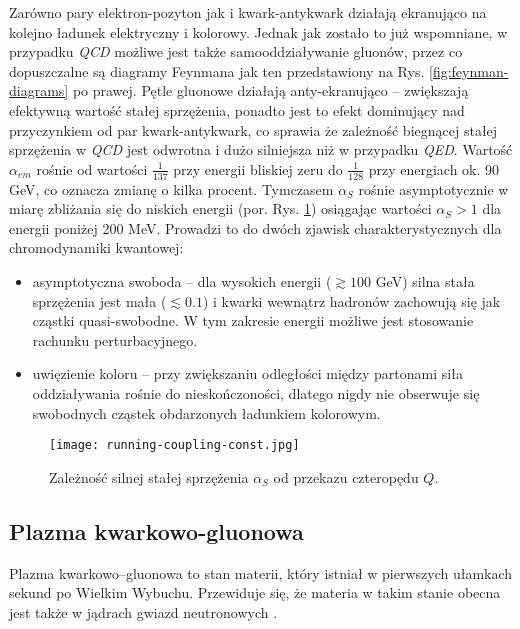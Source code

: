 Zarówno pary elektron-pozyton jak i kwark-antykwark działają ekranująco na kolejno ładunek elektryczny i kolorowy. Jednak jak zostało to już wspomniane, w przypadku \textit{QCD} możliwe jest także samooddziaływanie gluonów, przez co dopuszczalne są diagramy Feynmana jak ten przedstawiony na Rys. \ref{fig:feynman-diagrams} po prawej. Pętle gluonowe działają anty-ekranująco -- zwiększają efektywną wartość stałej sprzężenia, ponadto jest to efekt dominujący nad przyczynkiem od par kwark-antykwark, co sprawia że zależność biegnącej stałej sprzężenia w \textit{QCD} jest odwrotna i dużo silniejsza niż w przypadku \textit{QED}. Wartość $\alpha_{em}$ rośnie od wartości $\frac{1}{137}$ przy  energii bliskiej zeru do $\frac{1}{128}$ przy energiach ok. 90 GeV, co oznacza zmianę o kilka procent. Tymczasem $\alpha_S$ rośnie asymptotycznie w miarę zbliżania się do niskich energii (por. Rys. \ref{fig:running-coupling-const}) osiągając wartości $\alpha_S > 1$ dla energii poniżej 200 MeV. Prowadzi to do dwóch zjawisk charakterystycznych dla chromodynamiki kwantowej: 
\begin{itemize}
	\item asymptotyczna swoboda -- dla wysokich energii ($\gtrsim 100$ GeV) silna stała sprzężenia jest mała ($\lesssim 0.1$) i kwarki wewnątrz hadronów zachowują się jak cząstki quasi-swobodne. W tym zakresie energii możliwe jest stosowanie rachunku perturbacyjnego.
	\item uwięzienie koloru -- przy zwiększaniu odległości między partonami siła oddziaływania rośnie do nieskończoności, dlatego nigdy nie obserwuje się swobodnych cząstek obdarzonych ładunkiem kolorowym.
\end{itemize}


\begin{figure}[h]
	\centering
	\texttt{[image: running-coupling-const.jpg]}
	\caption{Zależność silnej stałej sprzężenia $\alpha_S$ od przekazu czteropędu $Q$.}
	\label{fig:running-coupling-const}
\end{figure}


\subsection{Plazma kwarkowo-gluonowa}
\label{subsec:qgp}

Plazma kwarkowo--gluonowa  to stan materii, który istniał w pierwszych ułamkach sekund po Wielkim Wybuchu. Przewiduje się, że materia w takim stanie obecna jest także w jądrach gwiazd neutronowych \cite{Andronic:2014zha}.

